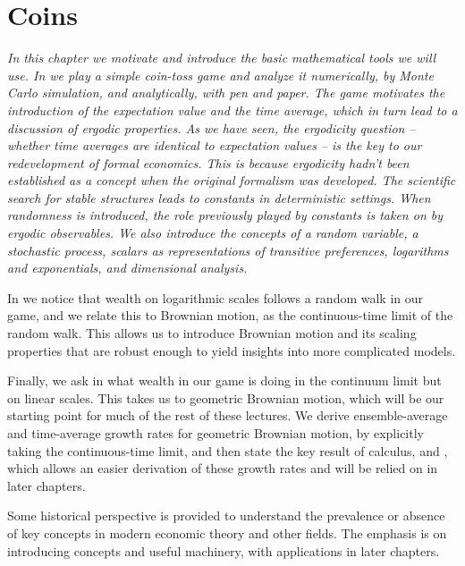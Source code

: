 
\section{Coins}

{\it In this chapter we motivate and introduce the basic mathematical tools we will use. In  we play a simple coin-toss game and analyze it 
numerically, by Monte Carlo simulation, and analytically, with pen and paper. The game motivates the 
introduction of the expectation value and the time average, which in turn 
lead to a discussion of ergodic properties. As we have seen, the ergodicity question  -- whether time averages are identical to expectation values -- is the key to our redevelopment of formal economics. This is because ergodicity hadn't been established as a concept when the original formalism was developed. The scientific search for stable structures leads to constants in deterministic settings. When randomness is introduced, the role previously played by constants is taken on by ergodic observables.
We also introduce the concepts of a random variable, a stochastic process, scalars as representations of transitive preferences, logarithms and exponentials, and dimensional analysis.

In  we notice that wealth on logarithmic scales follows a random walk in our game, and we relate this to Brownian motion, as the continuous-time limit of the random walk. This allows us to introduce Brownian motion and its scaling properties that are robust enough to yield insights into more complicated models.

Finally, we ask in  what wealth in our game is doing in the continuum limit but on linear scales. This takes us to geometric Brownian motion, which will be our starting point for much of the rest of these lectures. We derive ensemble-average and time-average growth rates for geometric Brownian motion, by explicitly taking the continuous-time limit, and then state the key result of \Ito calculus,  and , which allows an easier derivation of these growth rates and will be relied on in later chapters.

Some historical perspective is provided to understand the prevalence or
absence of key concepts in modern economic theory and other fields.
The emphasis is on introducing concepts and useful machinery, with applications in later chapters.}
\newpage

